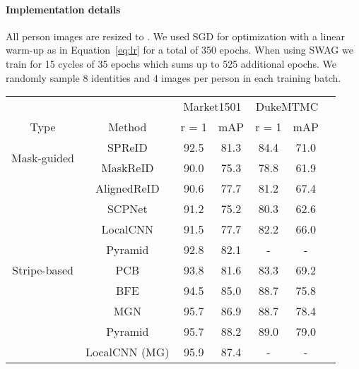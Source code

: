 \documentclass[sigconf]{acmart}
\begin{document}
\paragraph{Implementation details}
All person images are resized to . We used SGD for optimization with a linear warm-up as in Equation~\eqref{eq:lr} for a total of 350 epochs. When using SWAG we train for 15 cycles of 35 epochs which sums up to 525 additional epochs. We randomly sample 8 identities and 4 images per person in each training batch.

\renewcommand{\multirowsetup}{\centering}
\begin{table}[tb]\footnotesize
  \begin{center}
  \begin{tabular}{ ccc|cc|cc}
\hline
    		&		& \multicolumn{2}{c|}{Market1501} & \multicolumn{2}{c}{DukeMTMC}	 \\
  Type   & Method & r = 1 	& mAP	&r = 1 	& mAP 	 \\
 	\hline
\hline
    \multirow{2}{1cm}{Mask-guided}& SPReID \cite{kalayeh2018human}   & 92.5 & 81.3	& 84.4	&71.0		\\
                                & MaskReID \cite{qi2018maskreid}     &90.0	&75.3	&78.8	&61.9		\\
 \hline
    \multirow{9}{1cm}{Stripe-based}& AlignedReID \cite{zhang2017alignedreid}&90.6 &77.7 &81.2	&67.4 		\\
                                & SCPNet \cite{fan2018scpnet}       & 91.2	&75.2	&80.3	&62.6		\\
                                & LocalCNN \cite{yang2018local}    & 91.5	& 77.7	&82.2	&66.0		\\
                                & Pyramid\cite{zheng2018pyramid}     & 92.8 &82.1	&-	&-		\\
                                & PCB \cite{sun2018pcb}          & 93.8	&81.6	&83.3	&69.2		\\
                                & BFE\cite{dai2018batch}            & 94.5 &85.0	&88.7	&75.8		\\
                                & MGN \cite{wang2018learning}  & 95.7	& 86.9	&88.7	&78.4		\\
                                & Pyramid\cite{zheng2018pyramid}     & 95.7 &88.2	&89.0	&79.0		\\
                                & LocalCNN (MG) \cite{yang2018local}  & 95.9	& 87.4	&-	&-		\\
\hline


\end{tabular}
\end{center}
\end{table}
\end{document}
